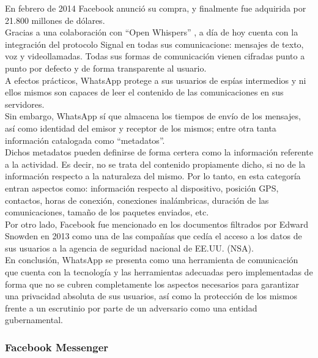 En febrero de 2014 Facebook anunció su compra, y finalmente fue adquirida por 21.800 millones de dólares. \\

Gracias a una colaboración con \hyphenquote{spanish}{Open Whispers} \cite{WikiOpenWhisper}, a día de hoy cuenta con la integración del protocolo Signal en todas sus comunicacione: mensajes de texto, voz y videollamadas. Todas sus formas de comunicación vienen cifradas punto a punto por defecto y de forma transparente al usuario. \\

A efectos prácticos, WhatsApp protege a sus usuarios de espías intermedios y ni ellos mismos son capaces de leer el contenido de las comunicaciones en sus servidores. \\

Sin embargo, WhatsApp sí que almacena los tiempos de envío de los mensajes, así como identidad del emisor y receptor de los mismos; entre otra tanta información catalogada como \hyphenquote{spanish}{metadatos}. \\

Dichos metadatos pueden definirse de forma certera como la información referente a la actividad. Es decir, no se trata del contenido propiamente dicho, si no de la información respecto a la naturaleza del mismo. Por lo tanto, en esta categoría entran aspectos como: información respecto al dispositivo, posición GPS, contactos, horas de conexión, conexiones inalámbricas, duración de las comunicaciones, tamaño de los paquetes enviados, etc. \\

Por otro lado, Facebook fue mencionado en los documentos filtrados por Edward Snowden en 2013 como una de las compañías que cedía el acceso a los datos de sus usuarios a la agencia de seguridad nacional de EE.UU. (NSA). \\

En conclusión, WhatsApp se presenta como una herramienta de comunicación que cuenta con la tecnología y las herramientas adecuadas pero implementadas de forma que no se cubren completamente los aspectos necesarios para garantizar una privacidad absoluta de sus usuarios, así como la protección de los mismos frente a un escrutinio por parte de un adversario como una entidad gubernamental. \\

\subsubsection {Facebook Messenger}

